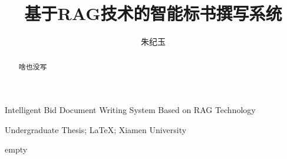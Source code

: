 \documentclass{xmu}
\begin{document}


\design


\title{基于RAG技术的智能标书撰写系统}
{Intelligent Bid Document Writing System Based on RAG Technology}

\author{朱纪玉}



\subject{网络空间安全}





{Undergraduate Thesis; LaTeX; Xiamen University}

\maketitle



\begin{abstract}
啥也没写
\end{abstract}

\begin{enabstract}
empty
\end{enabstract}

\tableofcontents
\end{document}

